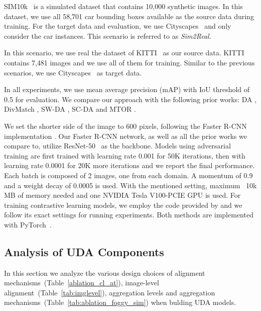 \documentclass[10pt,twocolumn,letterpaper]{article}
\DeclareRobustCommand{\Tableref}[1]{Table~\ref{#1}}
\begin{document}
 SIM10k~\cite{sim10k} is a simulated dataset that contains  10,000 synthetic images. In this dataset, we use all 58,701 car bounding boxes available as the source data during training. For the target data and evaluation, we use Cityscapes~\cite{city} and only consider the car instances. This scenario is referred to as \emph{Sim2Real}.

 In this scenario, we use real the dataset of KITTI~\cite{kitti} as our source data. KITTI contains 7,481 images and we use all of them for training. Similar to the previous scenarios, we use Cityscapes~\cite{city} as target data. 

In all experiments, we use mean average precision (mAP) with IoU threshold of 0.5 for evaluation. We compare our approach with the following prior works: DA \cite{da_faster_rcnn}, DivMatch \cite{diversify_and_match}, SW-DA \cite{strong-weak}, SC-DA \cite{zhu_cvpr19_selective_alignment} and MTOR \cite{mean_teacher}. 

 We set the shorter side of the image to 600 pixels, following the Faster R-CNN implementation \cite{ren2015faster}. Our Faster R-CNN network, as well as all the prior works we compare to, utilize ResNet-50~\cite{he2016deep} as the backbone. Models using adversarial training are first trained with learning rate 0.001 for 50K iterations, then with learning rate 0.0001 for 20K more iterations and we report the final performance. Each batch is composed of 2 images, one from each domain. A momentum of 0.9 and a weight decay of 0.0005 is used. With the mentioned setting, maximum ~10k MB of memory needed and one NVIDIA Tesla V100-PCIE GPU is used. For training contrastive learning models, we employ the code provided by \cite{GPA} and we follow its exact settings for running experiments. Both methods are implemented with PyTorch~\cite{pytorch}.   


\subsection{Analysis of UDA Components}
\label{subsec:res_experimental_analysis}
In this section we analyze the various design choices of alignment mechanisms~(\Tableref{ablation_cl_at}), image-level alignment~(\Tableref{tab:imglevel}), aggregation levels and aggregation mechanisms~(\Tableref{tab:ablation_foggy_sim}) when  bulding UDA models.
\end{document}
